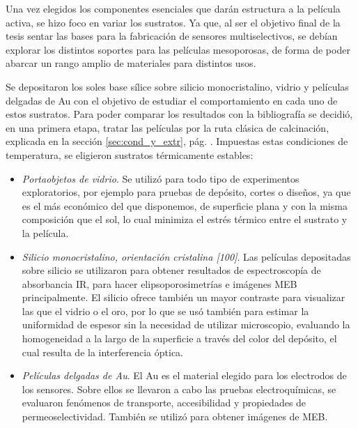 	Una vez elegidos los componentes esenciales que darán estructura a la película activa, se hizo foco en variar los sustratos. Ya que, al ser el objetivo final de la tesis sentar las bases para la fabricación de sensores multiselectivos, se debían explorar los distintos soportes para las películas mesoporosas, de forma de poder abarcar un rango amplio de materiales para distintos usos.

	Se depositaron los soles base sílice sobre silicio monocristalino, vidrio y películas delgadas de Au con el objetivo de estudiar el comportamiento en cada uno de estos sustratos. Para poder comparar los resultados con la bibliografía\cite{Soler-Illia2006,Brinker1990} se decidió, en una primera etapa, tratar las películas por la ruta clásica de calcinación, explicada en la sección \ref{sec:cond_y_extr}, pág. \pageref{sec:cond_y_extr}. Impuestas estas condiciones de temperatura, se eligieron sustratos térmicamente estables:

		\begin{itemize}

			\item \textit{Portaobjetos de vidrio}. Se utilizó para todo tipo de experimentos exploratorios, por ejemplo para pruebas de depósito, cortes o diseños, ya que es el más económico del que disponemos, de superficie plana y con la misma composición que el sol, lo cual minimiza el estrés térmico entre el sustrato y la película.

			\item \textit{Silicio monocristalino, orientación cristalina [100]}. Las películas depositadas sobre silicio se utilizaron para obtener resultados de espectroscopía de absorbancia IR, para hacer elipsoporosimetrías e imágenes MEB principalmente. El silicio ofrece también un mayor contraste para visualizar las \pdm\space que el vidrio o el oro, por lo que se usó también para estimar la uniformidad de espesor sin la necesidad de utilizar microscopio, evaluando la homogeneidad a la largo de la superficie a través del color del depósito, el cual resulta de la interferencia óptica.
		
			\item \textit{Películas delgadas de Au}. El Au es el material elegido para los electrodos de los sensores. Sobre ellos se llevaron a cabo las pruebas electroquímicas, se evaluaron fenómenos de transporte, accesibilidad y propiedades de permeoselectividad. También se utilizó para obtener imágenes de MEB. 

			\end{itemize}
	
